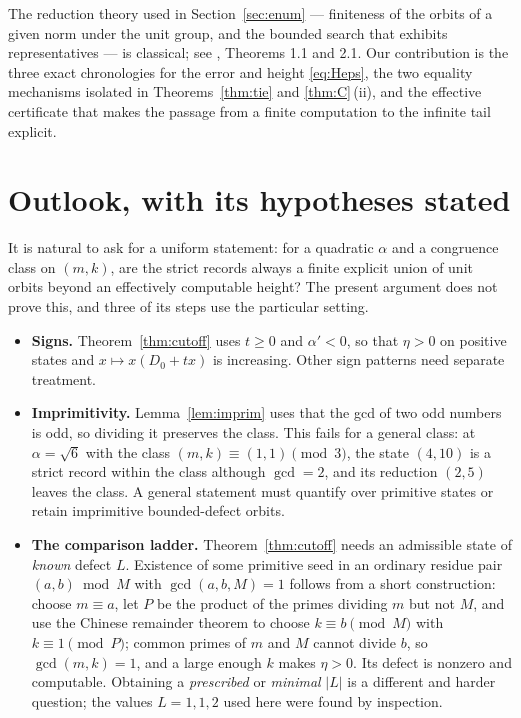 \documentclass[11pt]{article}
\theoremstyle{definition}
\theoremstyle{remark}
\begin{document}
The reduction theory used in Section~\ref{sec:enum} --- finiteness of the orbits of a given norm
under the unit group, and the bounded search that exhibits representatives --- is classical; see
\cite{Conrad}, Theorems 1.1 and 2.1. Our contribution is the three exact chronologies for the error and height
\eqref{eq:Heps}, the two equality mechanisms isolated in Theorems~\ref{thm:tie} and
\ref{thm:C}\,(ii), and the effective certificate that makes the passage from a finite
computation to the infinite tail explicit.

\section{Outlook, with its hypotheses stated}\label{sec:outlook}

It is natural to ask for a uniform statement: for a quadratic $\alpha$ and a congruence class on
$(m,k)$, are the strict records always a finite explicit union of unit orbits beyond an
effectively computable height? The present argument does not prove this, and three of its steps
use the particular setting.

\begin{itemize}\itemsep3pt
\item \textbf{Signs.} Theorem~\ref{thm:cutoff} uses $t\ge0$ and $\alpha'<0$, so that $\eta>0$ on
positive states and $x\mapsto x(D_0+tx)$ is increasing. Other sign patterns need separate
treatment.
\item \textbf{Imprimitivity.} Lemma~\ref{lem:imprim} uses that the gcd of two odd numbers is
odd, so dividing it preserves the class. This fails for a general class: at $\alpha=\sqrt6$ with
the class $(m,k)\equiv(1,1)\pmod3$, the state $(4,10)$ is a strict record within the class
although $\gcd=2$, and its reduction $(2,5)$ leaves the class. A general statement must quantify
over primitive states or retain imprimitive bounded-defect orbits.
\item \textbf{The comparison ladder.} Theorem~\ref{thm:cutoff} needs an admissible state of
\emph{known} defect $L$. Existence of some primitive seed in an ordinary residue pair
$(a,b)\bmod M$ with $\gcd(a,b,M)=1$ follows from a short construction: choose $m\equiv a$, let
$P$ be the product of the primes dividing $m$ but not $M$, and use the Chinese remainder theorem
to choose $k\equiv b\pmod M$ with $k\equiv1\pmod P$; common primes of $m$ and $M$ cannot divide
$b$, so $\gcd(m,k)=1$, and a large enough $k$ makes $\eta>0$. Its defect is nonzero and
computable. Obtaining a \emph{prescribed} or \emph{minimal} $|L|$ is a different and harder
question; the values $L=1,1,2$ used here were found by inspection.
\end{itemize}
\end{document}
